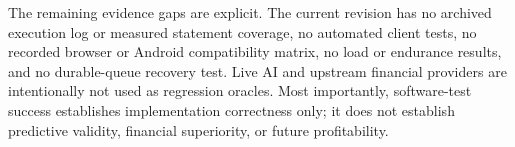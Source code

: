 The remaining evidence gaps are explicit. The current revision has no archived execution log or measured statement coverage, no automated client tests, no recorded browser or Android compatibility matrix, no load or endurance results, and no durable-queue recovery test. Live AI and upstream financial providers are intentionally not used as regression oracles. Most importantly, software-test success establishes implementation correctness only; it does not establish predictive validity, financial superiority, or future profitability.
